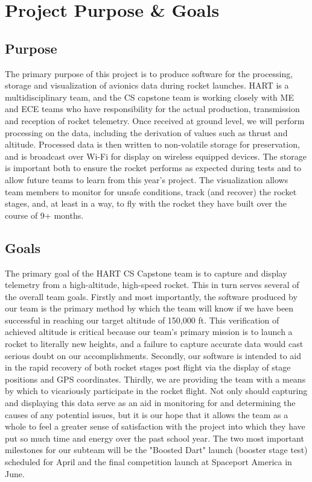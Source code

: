 \documentclass[journal,10pt,onecolumn,compsoc]{IEEEtran}
\begin{document}

\section{Project Purpose \& Goals}

	\subsection{Purpose}
		\noindent The primary purpose of this project is to produce software for the processing, storage and visualization of avionics data during rocket launches.
		HART is a multidisciplinary team, and the CS capstone team is working closely with ME and ECE teams who have responsibility for the actual production, transmission and reception of rocket telemetry.
		Once received at ground level, we will perform processing on the data, including the derivation of values such as thrust and altitude.
		Processed data is then written to non-volatile storage for preservation, and is broadcast over Wi-Fi for display on wireless equipped devices.
		The storage is important both to ensure the rocket performs as expected during tests and to allow future teams to learn from this year's project.
		The visualization allows team members to monitor for unsafe conditions, track (and recover) the rocket stages, and, at least in a way, to fly with the rocket they have built over the course of 9+ months.
	
	\subsection{Goals}
		\noindent The primary goal of the HART CS Capstone team is to capture and display telemetry from a high-altitude, high-speed rocket.
		This in turn serves several of the overall team goals.
		Firstly and most importantly, the software produced by our team is the primary method by which the team will know if we have been successful in reaching our target altitude of 150,000 ft.
		This verification of achieved altitude is critical because our team's primary mission is to launch a rocket to literally new heights, and a failure to capture accurate data would cast serious doubt on our accomplishments.
		Secondly, our software is intended to aid in the rapid recovery of both rocket stages post flight via the display of stage positions and GPS coordinates.
		Thirdly, we are providing the team with a means by which to vicariously participate in the rocket flight.
		Not only should capturing and displaying this data serve as an aid in monitoring for and determining the causes of any potential issues, but it is our hope that it allows the team as a whole to feel a greater sense of satisfaction with the project into which they have put so much time and energy over the past school year.
		The two most important milestones for our subteam will be the "Boosted Dart" launch (booster stage test) scheduled for April and the final competition launch at Spaceport America in June.
\newpage
\end{document}
